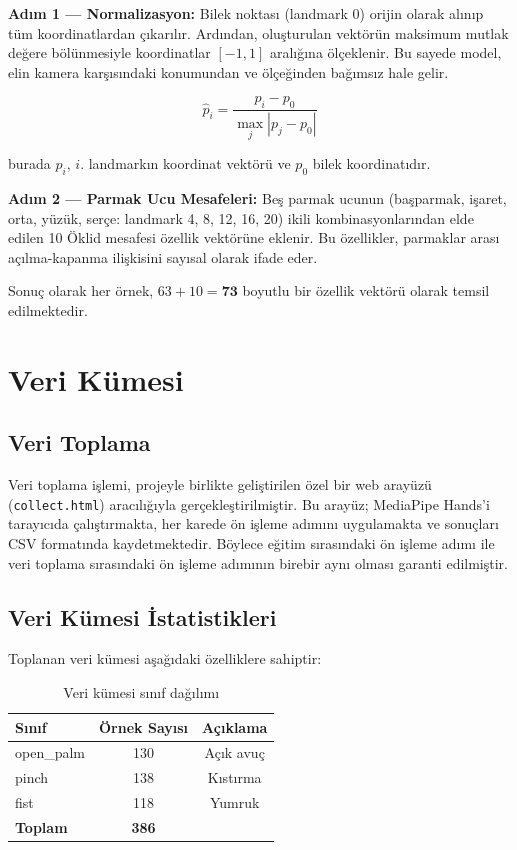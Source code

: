 \documentclass[12pt,a4paper]{article}
\begin{document}
\textbf{Adım 1 — Normalizasyon:} Bilek noktası (landmark 0) orijin olarak alınıp tüm koordinatlardan çıkarılır. Ardından, oluşturulan vektörün maksimum mutlak değere bölünmesiyle koordinatlar $[-1, 1]$ aralığına ölçeklenir. Bu sayede model, elin kamera karşısındaki konumundan ve ölçeğinden bağımsız hale gelir.

\begin{equation}
\hat{p}_i = \frac{p_i - p_0}{\max_{j} |p_j - p_0|}
\end{equation}

burada $p_i$, $i$. landmarkın koordinat vektörü ve $p_0$ bilek koordinatıdır.

\textbf{Adım 2 — Parmak Ucu Mesafeleri:} Beş parmak ucunun (başparmak, işaret, orta, yüzük, serçe: landmark 4, 8, 12, 16, 20) ikili kombinasyonlarından elde edilen 10 Öklid mesafesi özellik vektörüne eklenir. Bu özellikler, parmaklar arası açılma-kapanma ilişkisini sayısal olarak ifade eder.

Sonuç olarak her örnek, $63 + 10 = \mathbf{73}$ boyutlu bir özellik vektörü olarak temsil edilmektedir.

\section{Veri Kümesi}

\subsection{Veri Toplama}

Veri toplama işlemi, projeyle birlikte geliştirilen özel bir web arayüzü (\texttt{collect.html}) aracılığıyla gerçekleştirilmiştir. Bu arayüz; MediaPipe Hands'i tarayıcıda çalıştırmakta, her karede ön işleme adımını uygulamakta ve sonuçları CSV formatında kaydetmektedir. Böylece eğitim sırasındaki ön işleme adımı ile veri toplama sırasındaki ön işleme adımının birebir aynı olması garanti edilmiştir.

\subsection{Veri Kümesi İstatistikleri}

Toplanan veri kümesi aşağıdaki özelliklere sahiptir:

\begin{table}[H]
\centering
\caption{Veri kümesi sınıf dağılımı}
\begin{tabular}{@{}lcc@{}}
\toprule
\textbf{Sınıf} & \textbf{Örnek Sayısı} & \textbf{Açıklama} \\
\midrule
open\_palm & 130 & Açık avuç \\
pinch & 138 & Kıstırma \\
fist & 118 & Yumruk \\
\midrule
\textbf{Toplam} & \textbf{386} & \\
\bottomrule
\end{tabular}
\end{table}
\end{document}
